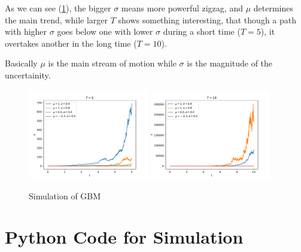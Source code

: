     \problem
    As we can see (\cref{fig:simulation}), the bigger $\sigma$ means more
    powerful zigzag, and $\mu$ determines the main trend,
    while larger $T$ shows something interesting, that though
    a path with higher $\sigma$ goes below one with lower
    $\sigma$ during a short time ($T=5$),
    it overtakes another in the long time ($T=10$).

    Basically $\mu$ is the main stream of motion while
    $\sigma$ is the magnitude of the uncertainity.

    \begin{figure}
        \centering
        \includegraphics[width=0.47\textwidth]{T=5}
        \includegraphics[width=0.47\textwidth]{T=10}
        \caption{Simulation of GBM}
        \label{fig:simulation}
    \end{figure}

    \appendix
    \section{Python Code for Simulation}
    \begin{fullwidth}
    
    \end{fullwidth}